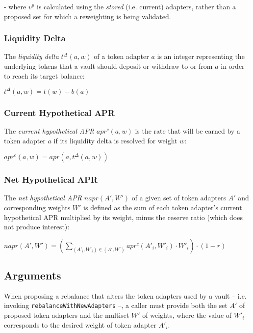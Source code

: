 \documentclass{article}
\begin{document}
\noindent
- where $v^p$ is calculated using the \textit{stored} (i.e. current) adapters, rather than a proposed set for which a reweighting is being validated.

\subsubsection*{Liquidity Delta}

The \textit{liquidity delta} $t^{\Delta}(a, w)$ of a token adapter $a$ is an integer representing the underlying tokens that a vault should deposit or withdraw to or from $a$ in order to reach its target balance:

\begin{center}
    $t^{\Delta}(a, w) = t(w) - b(a)$
\end{center}

\subsubsection*{Current Hypothetical APR}

The \textit{current hypothetical APR} $apr^{c}(a, w)$ is the rate that will be earned by a token adapter $a$ if its liquidity delta is resolved for weight $w$:

\begin{center}
    $apr^{c}(a, w) = apr(a, t^{\Delta}(a, w))$
\end{center}

\subsubsection*{Net Hypothetical APR}

The \textit{net hypothetical APR} $napr(A', W')$ of a given set of token adapters $A'$ and corresponding weights $W'$ is defined as the sum of each token adapter's current hypothetical APR multiplied by its weight, minus the reserve ratio (which does not produce interest):

\begin{center}
    $napr(A', W') = \left(\sum\limits_{(A'_{i}, W'_i) \in (A', W')} apr^{c}(A'_{i}, W'_{i}) \cdot W'_{i}\right) \cdot (1 - r)$
\end{center}

\subsection{Arguments}

When proposing a rebalance that alters the token adapters used by a vault -- i.e. invoking \texttt{rebalanceWithNewAdapters} --, a caller must provide both the set $A'$ of proposed token adapters and the multiset $W'$ of weights, where the value of $W'_i$ corresponds to the desired weight of token adapter $A'_i$.\\
\end{document}
